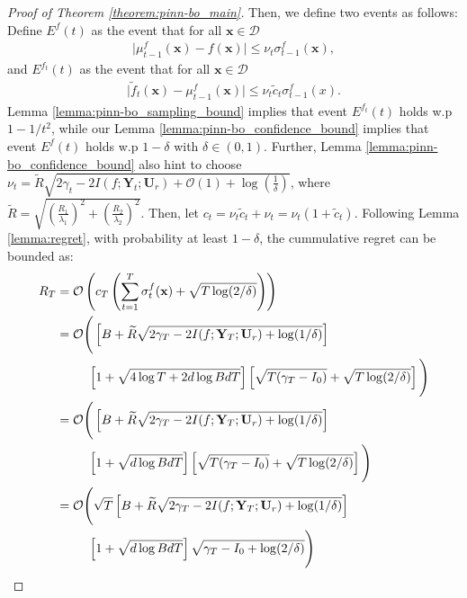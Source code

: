 \begin{proof}[Proof of Theorem \ref{theorem:pinn-bo_main}]
Then, we define two events as follows:
Define $E^f(t)$ as the event that for all $\mathbf{x} \in \mathcal{D}$
\begin{align*} 
\lvert \mu_{t-1}^f(\mathbf{x}) - f(\mathbf{x}) \rvert \le \nu_t \sigma_{t-1}^f (\mathbf{x}), 
\end{align*}
and $E^{f_t}(t)$ as the event that for all $\mathbf{x} \in \mathcal{D}$
\begin{align*}
    \lvert \widetilde{f}_t(\mathbf{x}) - \mu_{t-1}^f(\mathbf{x})\rvert \le \nu_t \widetilde{c}_t\sigma_{t-1}^f(x).
\end{align*}
Lemma \ref{lemma:pinn-bo_sampling_bound} implies that event $E^{f_t}(t)$ holds w.p $1-1/t^2$, while our Lemma \ref{lemma:pinn-bo_confidence_bound} implies that event $E^f(t)$ holds w.p $1-\delta$ with $\delta \in (0,1)$. Further, Lemma \ref{lemma:pinn-bo_confidence_bound} also hint to choose $\nu_t = \widetilde{R} \sqrt{2\gamma_t - 2 I(f; \mathbf{Y}_t; \mathbf{U}_r) + \mathcal{O}(1) + \log(\frac{1}{\delta})}$, where $\widetilde{R} = \sqrt{\left(\frac{R_1}{\lambda_1}\right)^2 + \left(\frac{R_2}{\lambda_2}\right)^2}$. Then, let $c_t = \nu_t \widetilde{c}_t + \nu_t = \nu_t (1+\widetilde{c}_t)$. Following Lemma \ref{lemma:regret}, with probability at least $1-\delta$, the cummulative regret can be bounded as: 
\begin{align*}
    R_T &= \mathcal{O}\left(c_T\left(\sum_{t=1}^T \sigma_t^f(\mathbf{x}) + \sqrt{T\log(2/\delta)}\right)\right)
    \\
    &= \mathcal{O}\Bigg( \left[B + \widetilde{R}\sqrt{2\gamma_T - 2I(f;\mathbf{Y}_T; \mathbf{U}_r)+\log(1/\delta)} \right] \notag
    \\
    & \;\;\;\;\;\;\;\;\; \left[1 +  \sqrt{4 \log T + 2d\log BdT} \right] \left[ \sqrt{T(\gamma_T - I_0)} + \sqrt{T\log(2/\delta)} \right] \Bigg)
    \\
    &= \mathcal{O}\Bigg( \left[B + \widetilde{R}\sqrt{2\gamma_T - 2I(f;\mathbf{Y}_T; \mathbf{U}_r)+\log(1/\delta)} \right] \notag
    \\
    & \;\;\;\;\;\;\;\;\; \left[1 +  \sqrt{d\log BdT}\right] \left[\sqrt{T(\gamma_T - I_0)} + \sqrt{T\log(2/\delta)}\right] \Bigg) 
    \\
    &= \mathcal{O}\Bigg( \sqrt{T} \left[B + \widetilde{R}\sqrt{2\gamma_T - 2I(f;\mathbf{Y}_T; \mathbf{U}_r)+\log(1/\delta)} \right] \notag 
    \\
    & \;\;\;\;\;\;\;\;\; \left[1 +  \sqrt{d\log BdT}\right]  \sqrt{\gamma_T - I_0 + \log(2/\delta)}   \Bigg)
    \\

\end{align*}
\end{proof}
